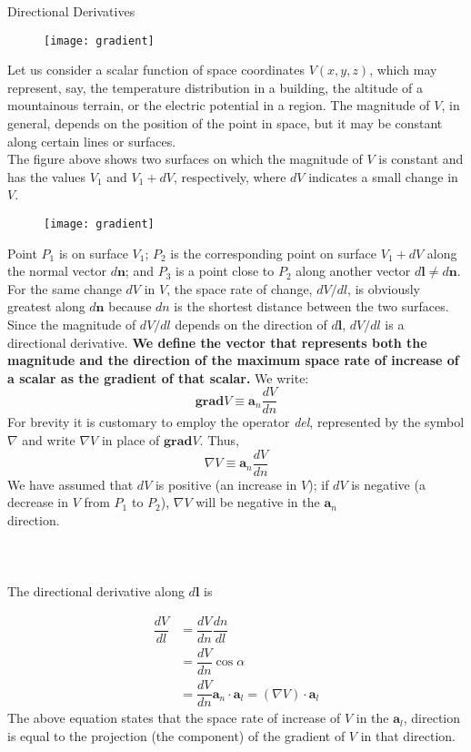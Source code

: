 \documentclass[10pt]{beamer}
\begin{document}
\begin{frame}[allowframebreaks]{Directional Derivatives }
	
	\begin{figure}[H]
		\centering
		\texttt{[image: gradient]}
	\end{figure}
\noindent 
Let us consider a scalar function of space coordinates $V(x, y , z)$, which may
represent, say, the temperature distribution in a building, the altitude of a mountainous
terrain, or the electric potential in a region. The magnitude of $V$, in general,
depends on the position of the point in space, but it may be constant along certain
lines or surfaces.
\\The figure above shows two surfaces on which the magnitude of $V$ is
constant and has the values $V_1$ and $V_1 + dV$, respectively, where $dV$ indicates a small
change in $V$.


\newpage
	\begin{figure}[H]
		\centering
		\texttt{[image: gradient]}
	\end{figure}
	\noindent 

Point $P_1$ is on surface $V_1$;
$P_2$ is the corresponding point on surface $V_1 + dV$ along the normal vector $d\mathbf{n}$; and
$P_3$ is a point close to $P_2$ along another vector $d\mathbf{l}\neq d\mathbf{n}$.\\
For the same change $dV$ in
$V$, the space rate of change, $dV/ dl$, is obviously greatest along $d\mathbf{n}$ because $dn$ is the shortest distance between the two surfaces.
\\Since the magnitude of $dV/dl$ depends
on the direction of $d\mathbf{l}$, $dV/dl$ is a {\color{red}directional derivative}.
\newpage
{\bf We define the vector that
	represents both the magnitude and the direction of the maximum space rate of increase
	of a scalar as the {\color{red}gradient} of that scalar.} We write:
$$\textbf{grad}V \equiv \mathbf{a}_n\dfrac{dV}{dn}$$
For brevity it is customary to employ the operator {\it del}, represented by the symbol
$\nabla $ and write $\nabla V$ in place of $\textbf{grad}V$. Thus,
$$\nabla V\equiv \mathbf{a}_n\dfrac{dV}{dn}$$
We have assumed that $dV$ is positive (an increase in $V$); if $dV$ is negative (a decrease in $V$ from $P_1$ to $P_2$), $\nabla V$ will be negative in the $\mathbf{a}_n$ direction.~~~~~~~~~~~~~~~~~~~~~~~~~~~~~~~~~~~~~~~~~~~~~~~~~~\\~\\~\\~
\\The directional derivative along $d\mathbf{l}$ is

\begin{align*}
\dfrac{dV}{dl} &= \dfrac{dV}{dn}\dfrac{dn}{dl}
\\&= \dfrac{dV}{dn}\cos\alpha
\\&= \dfrac{dV}{dn}\mathbf{a}_n\cdot\mathbf{a}_l = (\nabla V)\cdot \mathbf{a}_l
\end{align*}
The above equation states that the space rate of increase of $V$ in the $\mathbf{a}_l$, direction is equal
to the projection (the component) of the gradient of $V$ in that direction.


\end{frame}
\end{document}

